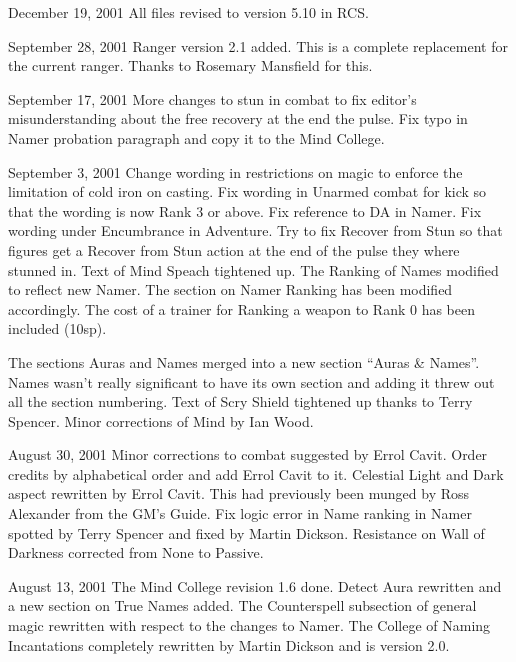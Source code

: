 \begin{edition}{1.4}
\item[December 19, 2001] All files revised to version 5.10 in
RCS.

\item[September 28, 2001] Ranger version 2.1 added.  This is
a complete replacement for the current ranger.  Thanks to
Rosemary Mansfield for this.

\item[September 17, 2001] More changes to stun in combat to fix
editor's misunderstanding about the free recovery at the end
the pulse.  Fix typo in Namer probation paragraph and copy it to
the Mind College.

\item[September 3, 2001] Change wording in restrictions on magic to
enforce the limitation of cold iron on casting.  Fix wording in
Unarmed combat for kick so that the wording is now Rank 3 or above.
Fix reference to DA in Namer.  Fix wording under Encumbrance in
Adventure.  Try to fix Recover from Stun so that figures get a Recover
from Stun action at the end of the pulse they where stunned in.  Text
of Mind Speach tightened up.  The Ranking of Names modified to reflect
new Namer.  The section on Namer Ranking has been modified
accordingly.  The cost of a trainer for Ranking a weapon to Rank 0 has
been included (10sp).

The sections Auras and Names merged into a new section ``Auras \&
Names''.  Names wasn't really significant to have its own section and
adding it threw out all the section numbering.  Text of Scry Shield
tightened up thanks to Terry Spencer.  Minor corrections of Mind
by Ian Wood.

\item[August 30, 2001] Minor corrections to combat suggested by Errol
Cavit.  Order credits by alphabetical order and add Errol Cavit to it.
Celestial Light and Dark aspect rewritten by Errol Cavit.  This had
previously been munged by Ross Alexander from the GM's Guide.  Fix
logic error in Name ranking in Namer spotted by Terry Spencer and
fixed by Martin Dickson.  Resistance on Wall of Darkness corrected
from None to Passive.

\item[August 13, 2001] The Mind College revision 1.6 done.  Detect
Aura rewritten and a new section on True Names added.  The
Counterspell subsection of general magic rewritten with respect
to the changes to Namer.  The College of Naming Incantations
completely rewritten by Martin Dickson and is version 2.0.


\end{edition}
